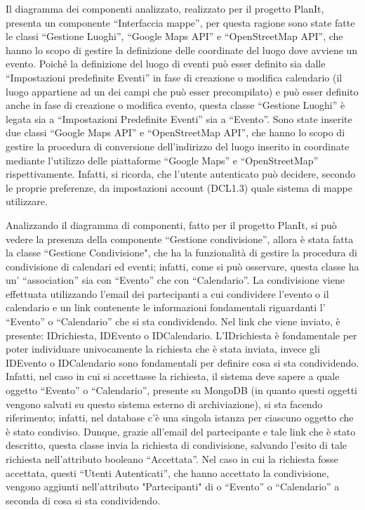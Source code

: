 \begin{listaPersonale}[DCL]{}
\begin{listaPersonale2}[DCL]{}
        Il diagramma dei componenti analizzato, realizzato per il progetto PlanIt, presenta un componente “Interfaccia mappe”, per questa ragione sono state fatte le classi “Gestione Luoghi”, “Google Maps API” e “OpenStreetMap API”, che hanno lo scopo di gestire la definizione delle coordinate del luogo dove avviene un evento. Poiché la definizione del luogo di eventi può esser definito sia dalle “Impostazioni predefinite Eventi” in fase di creazione o modifica calendario (il luogo appartiene ad un dei campi che può esser precompilato) e può esser definito anche in fase di creazione o modifica evento, questa classe “Gestione Luoghi” è legata sia a “Impostazioni Predefinite Eventi” sia a “Evento”.
        Sono state inserite due classi “Google Maps API” e “OpenStreetMap API”, che hanno lo scopo di gestire la procedura di conversione dell'indirizzo del luogo inserito in coordinate mediante l'utilizzo delle piattaforme “Google Maps” e “OpenStreetMap” rispettivamente. Infatti, si ricorda, che l'utente autenticato può decidere, secondo le proprie preferenze, da impostazioni account (DCL1.3) quale sistema di mappe utilizzare.



        Analizzando il diagramma di componenti, fatto per il progetto PlanIt, si può vedere la presenza della componente “Gestione condivisione”, allora è stata fatta la classe “Gestione Condivisione", che ha la funzionalità di gestire la procedura di condivisione di calendari ed eventi; infatti, come si può osservare, questa classe ha un' “association” sia con “Evento” che con “Calendario”.  La condivisione viene effettuata utilizzando l'email dei partecipanti a cui condividere l'evento o il calendario e un link contenente le informazioni fondamentali riguardanti l' “Evento” o “Calendario” che si sta condividendo. Nel link che viene inviato, è presente: IDrichiesta, IDEvento o IDCalendario. L'IDrichiesta è fondamentale per poter individuare univocamente la richiesta che è stata inviata, invece gli IDEvento o IDCalendario sono fondamentali per definire cosa si sta condividendo. Infatti, nel caso in cui si accettasse la richiesta, il sistema deve sapere a quale oggetto “Evento” o “Calendario”, presente su MongoDB (in quanto questi oggetti vengono salvati su questo sistema esterno di archiviazione), si sta facendo riferimento; infatti, nel database c'è una singola istanza per ciascuno oggetto che è stato condiviso. Dunque, grazie all'email del partecipante e tale link che è stato descritto, questa classe invia la richiesta di condivisione, salvando l'esito di tale richiesta nell'attributo booleano “Accettata”. Nel caso in cui la richiesta fosse accettata, questi “Utenti Autenticati”, che hanno accettato la condivisione, vengono aggiunti nell'attributo "Partecipanti" di o “Evento” o “Calendario” a seconda di cosa si sta condividendo.


\end{listaPersonale2}
\end{listaPersonale}
